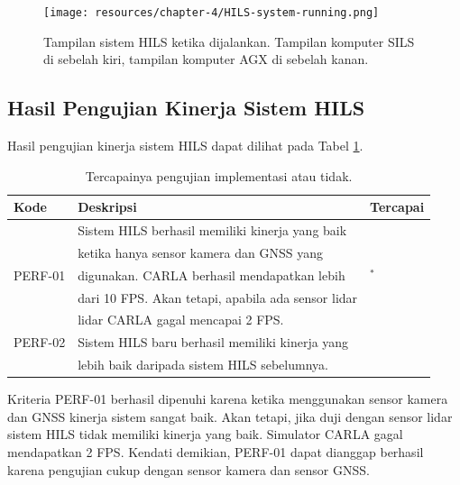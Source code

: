\begin{figure}[!htbp]
	\centering
	\texttt{[image: resources/chapter-4/HILS-system-running.png]}
	\caption{Tampilan sistem HILS ketika dijalankan. Tampilan komputer SILS di
		sebelah kiri, tampilan komputer AGX di sebelah kanan.}
	\label{chapter-4-fig-hils-running}
\end{figure}

\subsection{Hasil Pengujian Kinerja Sistem HILS}

Hasil pengujian kinerja sistem HILS dapat dilihat pada Tabel \ref{chapter-4-tbl-perf-criteria-result}.
\begin{table}[!htbp]
	\begin{center}
		\begin{tabular}{|l|l|l|}
			\hline
			\textbf{Kode} & \textbf{Deskripsi}                                 & \textbf{Tercapai} \\
			\hline
			              & Sistem HILS berhasil memiliki kinerja yang baik    &                   \\
			              & ketika hanya sensor kamera dan GNSS yang           &                   \\
			PERF-01       & digunakan. CARLA berhasil mendapatkan lebih        & \checkmark$^*$    \\
			              & dari 10 FPS. Akan tetapi, apabila ada sensor lidar &                   \\
			              & lidar CARLA gagal mencapai 2 FPS.                  &                   \\
			\hline
			PERF-02       & Sistem HILS baru berhasil memiliki kinerja yang    & \checkmark        \\
			              & lebih baik daripada sistem HILS sebelumnya.        &                   \\
			\hline
		\end{tabular}
	\end{center}

	\caption{Tercapainya pengujian implementasi atau tidak.}
	\label{chapter-4-tbl-perf-criteria-result}
\end{table}

Kriteria PERF-01 berhasil dipenuhi karena ketika menggunakan sensor kamera dan
GNSS kinerja sistem sangat baik. Akan tetapi, jika duji dengan sensor lidar
sistem HILS tidak memiliki kinerja yang baik. Simulator CARLA gagal mendapatkan
2 FPS. Kendati demikian, PERF-01 dapat dianggap berhasil karena pengujian cukup
dengan sensor kamera dan  sensor GNSS.

